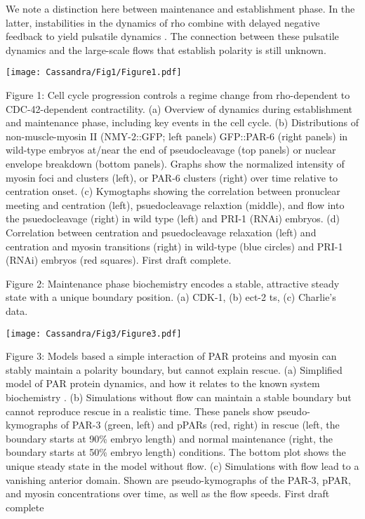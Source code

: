 \documentclass[11pt]{article}
\newcommand{\red}[1]{\color{red}#1\normalcolor}
\newcommand{\6}[1]{#1_{\text{6}}}
\newcommand{\3}[1]{#1_{\text{3}}}
\begin{document}
We note a distinction here between maintenance and establishment phase. In the latter, instabilities in the dynamics of rho combine with delayed negative feedback to yield pulsatile dynamics \citep{nishikawa2017controlling, michaux2018excitable, michaud2022versatile}. The connection between these pulsatile dynamics and the large-scale flows that establish polarity is still unknown.

\newpage 
\begin{center}
\texttt{[image: Cassandra/Fig1/Figure1.pdf]}
\end{center}

\newpage 
Figure 1: Cell cycle progression controls a regime change from rho-dependent to CDC-42-dependent contractility. (a) Overview of dynamics during establishment and maintenance phase, including key events in the cell cycle. (b) Distributions of non-muscle-myosin II (NMY-2::GFP; left panels) GFP::PAR-6 (right panels) in wild-type embryos at/near the end of pseudocleavage (top panels) or nuclear envelope breakdown (bottom panels). Graphs show the normalized intensity of myosin foci and clusters (left), or PAR-6 clusters (right) over time relative to centration onset. (c) Kymogtaphs showing the correlation between pronuclear meeting and centration (left), psuedocleavage relaxtion (middle), and flow into the psuedocleavage (right) in wild type (left) and PRI-1 (RNAi) embryos. (d) Correlation between centration and psuedocleavage relaxation (left) and centration and myosin transitions (right) in wild-type (blue circles) and PRI-1 (RNAi) embryos (red squares). \red{First draft complete.}

\newpage
Figure 2: Maintenance phase biochemistry encodes a stable, attractive steady state with a unique boundary position. (a) CDK-1, (b) ect-2 ts, (c) Charlie's data.

\newpage 
\begin{center}
\texttt{[image: Cassandra/Fig3/Figure3.pdf]}
\end{center}


\newpage
Figure 3: Models based a simple interaction of PAR proteins and myosin can stably maintain a polarity boundary, but cannot explain rescue. (a) Simplified model of PAR protein dynamics, and how it relates to the known system biochemistry \citep{lang2017proteins}. (b) Simulations without flow can maintain a stable boundary but cannot reproduce rescue in a realistic time. These panels show pseudo-kymographs of PAR-3 (green, left) and pPARs (red, right) in rescue (left, the boundary starts at 90\% embryo length) and normal maintenance (right, the boundary starts at 50\% embryo length) conditions. The bottom plot shows the unique steady state in the model without flow. (c) Simulations with flow lead to a vanishing anterior domain. Shown are pseudo-kymographs of the PAR-3, pPAR, and myosin concentrations over time, as well as the flow speeds. \red{First draft complete}
\end{document}
